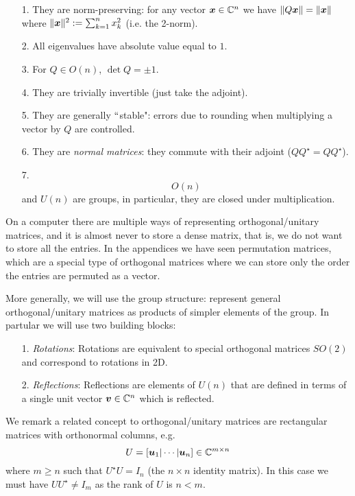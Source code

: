 \begin{itemize}
\item[1. ] They are norm-preserving: for any vector $\bm{{\mbox{\boldmath$x$\unboldmath}}} \in {\mathbb C}^n$ we have $\|Q \bm{{\mbox{\boldmath$x$\unboldmath}}} \| = \| \bm{{\mbox{\boldmath$x$\unboldmath}}}\|$ where $\| \bm{{\mbox{\boldmath$x$\unboldmath}}} \|^2 := \sum_{k=1}^n x_k^2$ (i.e. the 2-norm).


\item[2. ] All eigenvalues have absolute value equal to $1$.


\item[3. ] For $Q \ensuremath{\in} O(n)$,  $\det Q = \ensuremath{\pm}1$.


\item[4. ] They are trivially invertible (just take the adjoint).


\item[5. ] They are generally \ensuremath{\ldq}stable": errors due to rounding when multiplying a vector by $Q$ are controlled.


\item[6. ] They are \emph{normal matrices}: they commute with their adjoint ($Q Q^\ensuremath{\star} = Q Q^\ensuremath{\star}$). 


\item[7. ] \[
O(n)
\]
and $U(n)$ are groups, in particular, they are closed under multiplication.

\end{itemize}
On a computer there are multiple ways of representing orthogonal/unitary matrices, and it is almost never to store a dense matrix, that is, we do not want to store all the entries. In the appendices we have seen permutation matrices, which are a special type of orthogonal matrices where we can store only the order the entries are permuted as a vector. 

More generally, we will use the group structure: represent general orthogonal/unitary matrices as products of simpler elements of the group. In partular we will use two building blocks:

\begin{itemize}
\item[1. ] \emph{Rotations}: Rotations are equivalent to special orthogonal matrices $SO(2)$  and correspond to rotations in 2D.


\item[2. ] \emph{Reflections}:  Reflections are elements of $U(n)$ that are defined in terms of a single unit vector $\bm{{\mbox{\boldmath$v$\unboldmath}}} \in {\mathbb C}^n$ which is reflected.

\end{itemize}
We remark a related concept to orthogonal/unitary matrices are rectangular matrices with orthonormal columns, e.g.
\[
U = [\bm{{\mbox{\boldmath$u$\unboldmath}}}_1 | \cdots | \bm{{\mbox{\boldmath$u$\unboldmath}}}_n] \in {\mathbb C}^{m \times n}
\]
where $m \ensuremath{\geq} n$ such that $U^\ensuremath{\star} U =  I_n$ (the $n \ensuremath{\times} n$ identity matrix). In this case we must have $UU^\ensuremath{\star} \ensuremath{\neq} I_m$ as the rank of $U$ is $n < m$. 

